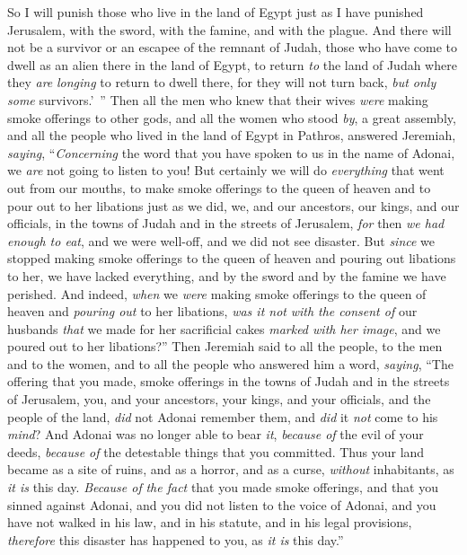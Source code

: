\begin{biblechapter}
\verse So I will punish those who live in the land of Egypt just as I have punished Jerusalem, with the sword, with the famine, and with the plague.
\verse And there will not be a survivor or an escapee of the remnant of Judah, those who have come to dwell as an alien there in the land of Egypt, to return \textit{to} the land of Judah where they \textit{are} \textit{longing} to return to dwell there, for they will not turn back, \textit{but only} \textit{some} survivors.’ ”
\verse Then all the men who knew that their wives \textit{were} making smoke offerings to other gods, and all the women who stood \textit{by}, a great assembly, and all the people who lived in the land of Egypt in Pathros, answered Jeremiah, \textit{saying},
\verse “\textit{Concerning} the word that you have spoken to us in the name of Adonai, we \textit{are} not going to listen to you!
\verse But certainly we will do \textit{everything} that went out from our mouths, to make smoke offerings to the queen of heaven and to pour out to her libations just as we did, we, and our ancestors, our kings, and our officials, in the towns of Judah and in the streets of Jerusalem, \textit{for} then \textit{we had enough to eat}, and we were well-off, and we did not see disaster.
\verse But \textit{since} we stopped making smoke offerings to the queen of heaven and pouring out libations to her, we have lacked everything, and by the sword and by the famine we have perished.
\verse And indeed, \textit{when} we \textit{were} making smoke offerings to the queen of heaven and \textit{pouring out} to her libations, \textit{was it not} \textit{with the consent of} our husbands \textit{that} we made for her sacrificial cakes \textit{marked with her image}, and we poured out to her libations?”
\verse Then Jeremiah said to all the people, to the men and to the women, and to all the people who answered him a word, \textit{saying},
\verse “The offering that you made, smoke offerings in the towns of Judah and in the streets of Jerusalem, you, and your ancestors, your kings, and your officials, and the people of the land, \textit{did} not Adonai remember them, and \textit{did} it \textit{not} come to his \textit{mind}?
\verse And Adonai was no longer able to bear \textit{it}, \textit{because of} the evil of your deeds, \textit{because of} the detestable things that you committed. Thus your land became as a site of ruins, and as a horror, and as a curse, \textit{without} inhabitants, as \textit{it is} this day.
\verse \textit{Because of} \textit{the fact} that you made smoke offerings, and that you sinned against Adonai, and you did not listen to the voice of Adonai, and you have not walked in his law, and in his statute, and in his legal provisions, \textit{therefore} this disaster has happened to you, as \textit{it is} this day.”

\end{biblechapter}
